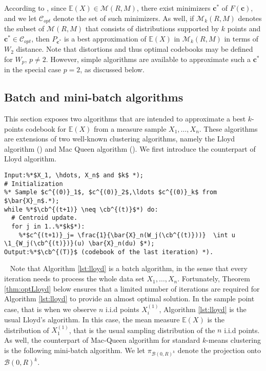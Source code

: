 \documentclass[noinfoline,preprint]{article}
\newcommand{\cb}{\mathbf{c}}
\newcommand{\E}{\mathbb{E}}
\renewcommand{\1}{\mathds 1}
\newcommand{\B}{\mathcal{B}}
\begin{document}
According to \cite[Corollary 3.1]{Fischer10}, since $\E(X) \in \mathcal{M}(R,M)$, there exist minimizers $\cb^*$ of $F(\cb)$, and we let $\mathcal{C}_{opt}$ denote the set of such minimizers. As well, if $\mathcal{M}_k(R,M)$ denotes the subset of $\mathcal{M}(R,M)$ that consists of distributions supported by $k$ points and $\cb^* \in \mathcal{C}_{opt}$, then $P_{\cb^*}$ is a best approximation of $\E(X)$ in $\mathcal{M}_k(R,M)$ in terms of $W_2$ distance. Note that distortions and thus optimal codebooks may be defined for $W_p$, $p\neq 2$. However, simple algorithms are available to approximate such a $\cb^*$ in the special case $p=2$, as discussed below. 


 

\subsection{Batch and mini-batch algorithms}\label{sec:Algorithms}

This section exposes two algorithms that are intended to approximate a best $k$-points codebook for $\E(X)$ from a measure sample $X_1, \hdots, X_n$. These algorithms are extensions of two well-known clustering algorithms, namely the Lloyd algorithm (\cite{Lloyd82}) and Mac Queen algorithm (\cite{MacQueen67}). We first introduce the counterpart of Lloyd algorithm.

\bigskip

\begin{lstlisting}[frame=single,caption={Batch algorithm (Lloyd)},label={lst:lloyd},abovecaptionskip=-\medskipamount]
Input:%*$X_1, \hdots, X_n$ and $k$ *);
# Initialization
%* Sample $c^{(0)}_1$, $c^{(0)}_2$,\ldots $c^{(0)}_k$ from $\bar{X}_n$.*);
while %*$\cb^{(t+1)} \neq \cb^{(t)}$*) do:
  # Centroid update.
  for j in 1..%*$k$*):
    %*$c^{(t+1)}_j= \frac{1}{\bar{X}_n(W_j(\cb^{(t)}))}  \int u \1_{W_j(\cb^{(t)})}(u) \bar{X}_n(du) $*);
Output:%*$\cb^{(T)}$ (codebook of the last iteration) *).
\end{lstlisting}

~
Note that Algorithm \ref{lst:lloyd} is a batch algorithm, in the sense that every iteration needs to process the whole data set $X_1, \hdots, X_n$. Fortunately, Theorem \ref{thm:optLloyd} below ensures that a limited number of iterations are required for Algorithm \ref{lst:lloyd} to provide an almost optimal solution. In the sample point case, that is when we observe $n$ i.i.d points $X^{(1)}_i$, Algorithm \ref{lst:lloyd} is the usual Lloyd's algorithm. In this case, the mean measure $\mathbb{E}(X)$ is the distribution of $X_1^{(1)}$, that is the usual sampling distribution of the $n$ i.i.d points. 
As well, the counterpart of Mac-Queen algorithm \cite{MacQueen67} for standard $k$-means clustering is the following mini-batch algorithm. We let $\pi_{\B(0,R)^k}$ denote the projection onto $\B(0,R)^k$. 
\end{document}
